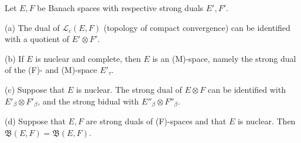 Let $E, F$ be Banach spaces with respective strong duals $E', F'$.

(a) The dual of $\mathcal{L}_c(E, F)$ (topology of compact convergence) can be identified with a quotient of $E' \otimes F'$.

(b) If $E$ is nuclear and complete, then $E$ is an (M)-space, namely the strong dual of the (F)- and (M)-space $E'_\tau$.

(c) Suppose that $E$ is nuclear. The strong dual of $E \otimes F$ can be identified with $E'_\beta \otimes F'_\beta$, and the strong bidual with $E''_\beta \otimes F''_\beta$.

(d) Suppose that $E, F$ are strong duals of (F)-spaces and that $E$ is nuclear. Then $\mathfrak{B}(E, F) = \mathfrak{B}(E, F)$.
